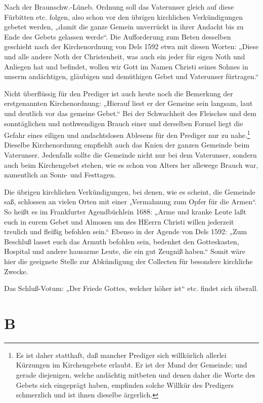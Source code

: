 Nach der Braunschw.-Lüneb. Ordnung soll das Vaterunser gleich auf diese Fürbitten etc. folgen, also schon vor den übrigen kirchlichen Verkündigungen gebetet werden, „damit die ganze Gemein unverrückt in ihrer Andacht bis zu Ende des Gebets gelassen werde“. Die Aufforderung zum Beten desselben geschieht nach der Kirchenordnung von Dels 1592 etwa mit diesen Worten: „Diese und alle andere Noth der Christenheit, was auch ein jeder für eigen Noth und Anliegen hat und befindet, wollen wir Gott im Namen Christi seines Sohnes in unserm andächtigen, gläubigen und demüthigen Gebet und Vaterunser fürtragen.“

Nicht überflüssig für den Prediger ist auch heute noch die Bemerkung der erstgenannten Kirchenordnung: „Hierauf liest er der Gemeine sein langsam, laut und deutlich vor das gemeine Gebet.“ Bei der Schwachheit des Fleisches und dem sonntäglichen und nothwendigen Brauch einer und derselben Formel liegt die Gefahr eines eiligen und andachtslosen Ablesens für den Prediger nur zu nahe.\footnote{Es ist daher statthaft, daß mancher Prediger sich willkürlich allerlei Kürzungen im Kirchengebete erlaubt. Er ist der Mund der Gemeinde; und gerade diejenigen, welche andächtig mitbeten und denen daher die Worte des Gebets sich eingeprägt haben, empfinden solche Willkür des Predigers schmerzlich und ist ihnen dieselbe ärgerlich.} Dieselbe Kirchenordnung empfiehlt auch das Knien der ganzen Gemeinde beim Vaterunser. Jedenfalls sollte die Gemeinde nicht nur bei dem Vaterunser, sondern auch beim Kirchengebet stehen, wie es schon von Alters her allewege Brauch war, namentlich an Sonn- und Festtagen.

Die übrigen kirchlichen Verkündigungen, bei denen, wie es scheint, die Gemeinde saß, schlossen an vielen Orten mit einer „Vermahnung zum Opfer für die Armen“. So heißt es im Frankfurter Agendbüchlein 1688: „Arme und kranke Leute laßt euch in eurem Gebet und Almosen um des HEerrn Christi willen jederzeit treulich und fleißig befohlen sein.“ Ebenso in der Agende von Dels 1592: „Zum Beschluß lasset euch das Armuth befohlen sein, bedenket den Gotteskasten, Hospital und andere hausarme Leute, die ein gut Zeugniß haben.“ Somit wäre hier die geeignete Stelle zur Abkündigung der Collecten für besondere kirchliche Zwecke.

Das Schluß-Votum: „Der Friede Gottes, welcher höher ist“ etc. findet sich überall.

\section{B}

